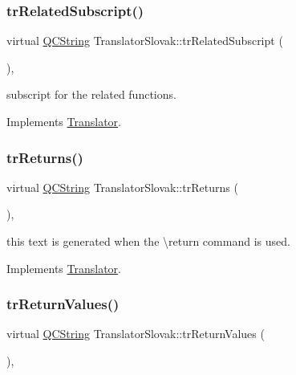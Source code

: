 \subsubsection{\texorpdfstring{trRelatedSubscript()}{trRelatedSubscript()}}
{\footnotesize\ttfamily virtual \mbox{\hyperlink{class_q_c_string}{Q\+C\+String}} Translator\+Slovak\+::tr\+Related\+Subscript (\begin{DoxyParamCaption}{ }\end{DoxyParamCaption})\hspace{0.3cm}{\ttfamily [inline]}, {\ttfamily [virtual]}}

subscript for the related functions. 

Implements \mbox{\hyperlink{class_translator}{Translator}}.

\mbox{\label{class_translator_slovak_af9e1bd3996f042bf004031baf746ddec}} 
\subsubsection{\texorpdfstring{trReturns()}{trReturns()}}
{\footnotesize\ttfamily virtual \mbox{\hyperlink{class_q_c_string}{Q\+C\+String}} Translator\+Slovak\+::tr\+Returns (\begin{DoxyParamCaption}{ }\end{DoxyParamCaption})\hspace{0.3cm}{\ttfamily [inline]}, {\ttfamily [virtual]}}

this text is generated when the \textbackslash{}return command is used. 

Implements \mbox{\hyperlink{class_translator}{Translator}}.

\mbox{\label{class_translator_slovak_a47cc3565c9cff44b72a62f3b338c1dfc}} 
\subsubsection{\texorpdfstring{trReturnValues()}{trReturnValues()}}
{\footnotesize\ttfamily virtual \mbox{\hyperlink{class_q_c_string}{Q\+C\+String}} Translator\+Slovak\+::tr\+Return\+Values (\begin{DoxyParamCaption}{ }\end{DoxyParamCaption})\hspace{0.3cm}{\ttfamily [inline]}, {\ttfamily [virtual]}}

